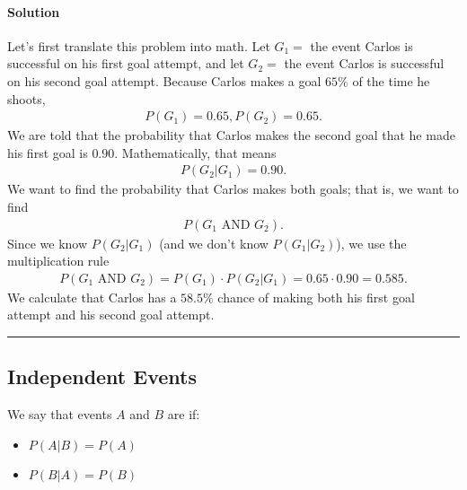 \documentclass[letterpaper,10pt,english]{jupyterBook}
\begin{document}
\paragraph{Solution}
\label{\detokenize{Ch3 Probability/3.3 Multiplication Rules and Independent Events:solution}}
\sphinxAtStartPar
Let’s first translate this problem into math. Let \(G_1 = \) the event Carlos is successful on his first goal attempt, and let \(G_2 = \) the event Carlos is successful on his second goal attempt. Because Carlos makes a goal \(65\%\) of the time he shoots,
\begin{equation*}
\begin{split} P(G_1) = 0.65, P(G_2) = 0.65.\end{split}
\end{equation*}
\sphinxAtStartPar
We are told that the probability that Carlos makes the second goal  that he made his first goal is \(0.90\). Mathematically, that means
\begin{equation*}
\begin{split} P(G_2|G_1) = 0.90. \end{split}
\end{equation*}
\sphinxAtStartPar
We want to find the probability that Carlos makes both goals; that is, we want to find
\begin{equation*}
\begin{split} P(G_1 \text{ AND } G_2). \end{split}
\end{equation*}
\sphinxAtStartPar
Since we know \(P(G_2|G_1)\) (and we don’t know \(P(G_1|G_2)\)), we use the multiplication rule
\begin{equation*}
\begin{split}P(G_1 \text{ AND } G_2) = P(G_1) \cdot P(G_2|G_1) = 0.65 \cdot 0.90 = 0.585.\end{split}
\end{equation*}
\sphinxAtStartPar
We calculate that Carlos has a \(58.5\%\) chance of making both his first goal attempt and his second goal attempt.


\bigskip\hrule\bigskip



\subsection{Independent Events}
\label{\detokenize{Ch3 Probability/3.3 Multiplication Rules and Independent Events:independent-events}}
\sphinxAtStartPar
We say that events \(A\) and \(B\) are  if:
\begin{itemize}
\item {} 
\sphinxAtStartPar
\(P(A|B) = P(A)\)

\item {} 
\sphinxAtStartPar
\(P(B|A) = P(B)\)

\end{itemize}
\end{document}
